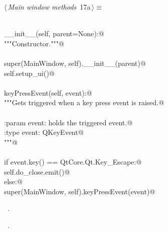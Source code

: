 \documentclass[
    a4paper,      %
    10pt,         %
    openright,    %
    notitlepage,  %
    parskip=half, %
]{scrreprt}       %
\theoremstyle{definition}                    %
\begin{document}
\begin{flushleft} \small
\begin{minipage}{\linewidth}\label{scrap7}\raggedright\small
{} $\langle\,${\itshape Main window methods}\nobreak\ {\footnotesize {17a}}$\,\rangle\equiv$
\vspace{-1exm}
\begin{list}{}{} \item
\mbox{}\lstinline@@\\
\mbox{}\lstinline@def __init__(self, parent=None):@\\
\mbox{}\lstinline@    """Constructor."""@\\
\mbox{}\lstinline@@\\
\mbox{}\lstinline@    super(MainWindow, self).__init__(parent)@\\
\mbox{}\lstinline@    self.setup_ui()@\\
\mbox{}\lstinline@@\\
\mbox{}\lstinline@def keyPressEvent(self, event):@\\
\mbox{}\lstinline@    """Gets triggered when a key press event is raised.@\\
\mbox{}\lstinline@@\\
\mbox{}\lstinline@    :param event: holds the triggered event.@\\
\mbox{}\lstinline@    :type  event: QKeyEvent@\\
\mbox{}\lstinline@    """@\\
\mbox{}\lstinline@@\\
\mbox{}\lstinline@    if event.key() == QtCore.Qt.Key_Escape:@\\
\mbox{}\lstinline@        self.do_close.emit()@\\
\mbox{}\lstinline@    else:@\\
\mbox{}\lstinline@        super(MainWindow, self).keyPressEvent(event)@\\
\mbox{}\lstinline@@{\NWsep}
\end{list}
\vspace{-1.5ex}
\footnotesize
\begin{list}{}{\setlength{\itemsep}{-\parsep}\setlength{\itemindent}{-\leftmargin}}
\item \NWtxtMacroDefBy\ .
\item \NWtxtMacroRefIn\ .

\item{}
\end{list}
\end{minipage}\vspace{4ex}
\end{flushleft}
\end{document}
